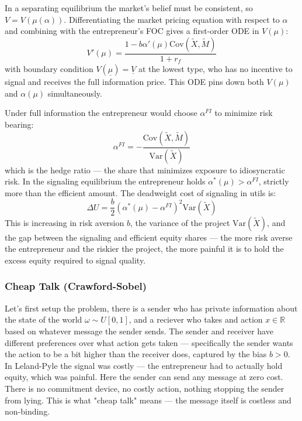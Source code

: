 \documentclass[11pt,english]{article}
\begin{document}
In a separating equilibrium the market's belief must be consistent, so $V = V(\mu(\alpha))$. Differentiating the market pricing equation with respect to $\alpha$ and combining with the entrepreneur's FOC gives a first-order ODE in $V(\mu)$:
\begin{equation}
    V'(\mu) = \frac{1 - b\alpha'(\mu)\text{Cov}(\tilde{X},\tilde{M})}{1+r_f}
\end{equation}
with boundary condition $V(\underline{\mu}) = \underline{V}$ at the lowest type, who has no incentive to signal and receives the full information price. This ODE pins down both $V(\mu)$ and $\alpha(\mu)$ simultaneously.

Under full information the entrepreneur would choose $\alpha^{FI}$ to minimize risk bearing:
\begin{equation}
    \alpha^{FI} = -\frac{\text{Cov}(\tilde{X}, \tilde{M})}{\text{Var}(\tilde{X})}
\end{equation}
which is the hedge ratio --- the share that minimizes exposure to idiosyncratic risk. In the signaling equilibrium the entrepreneur holds $\alpha^*(\mu) > \alpha^{FI}$, strictly more than the efficient amount. The deadweight cost of signaling in utils is:
\begin{equation}
    \Delta U = \frac{b}{2}\left(\alpha^*(\mu) - \alpha^{FI}\right)^2 \text{Var}(\tilde{X})
\end{equation}
This is increasing in risk aversion $b$, the variance of the project $\text{Var}(\tilde{X})$, and the gap between the signaling and efficient equity shares --- the more risk averse the entrepreneur and the riskier the project, the more painful it is to hold the excess equity required to signal quality.

\subsubsection{Cheap Talk (Crawford-Sobel)}
Let's first setup the problem, there is a sender who has private information about the state of the world $\omega \sim U[0,1]$, and a reciever who takes and action $x\in \mathbb{R}$ based on whatever message the sender sends. The sender and receiver have different preferences over what action gets taken — specifically the sender wants the action to be a bit higher than the receiver does, captured by the bias $b > 0$. In Leland-Pyle the signal was costly — the entrepreneur had to actually hold equity, which was painful. Here the sender can send any message at zero cost. There is no commitment device, no costly action, nothing stopping the sender from lying. This is what "cheap talk" means — the message itself is costless and non-binding. 
\end{document}
